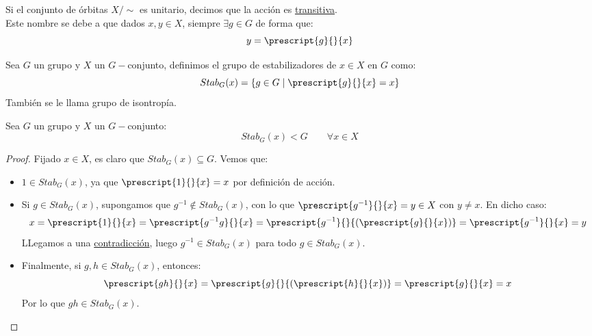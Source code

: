 \begin{definicion}
    Si el conjunto de órbitas $X/\sim$ es unitario, decimos que la acción es \underline{transitiva}.\\

    \noindent
    Este nombre se debe a que dados $x,y\in X$, siempre $\exists g\in G$ de forma que:
    \begin{equation*}
        y = \prescript{g}{}{x}
    \end{equation*}
\end{definicion}

\begin{definicion}[Estabilizador]
    Sea $G$ un grupo y $X$ un $G-$conjunto, definimos el grupo de estabilizadores de $x\in X$ en $G$ como:
    \begin{equation*}
        Stab_G(x) = \{g\in G \mid \prescript{g}{}{x} = x\}
    \end{equation*}
    También se le llama grupo de isontropía.
\end{definicion}

\begin{prop}
    Sea $G$ un grupo y $X$ un $G-$conjunto:
    \begin{equation*}
        Stab_G(x) < G \qquad \forall x\in X
    \end{equation*}
    \begin{proof}
        Fijado $x\in X$, es claro que $Stab_G(x) \subseteq G$. Vemos que:
        \begin{itemize}
            \item $1\in Stab_G(x)$, ya que $\prescript{1}{}{x} = x$ por definición de acción.
            \item Si $g\in Stab_G(x)$, supongamos que $g^{-1}\notin Stab_G(x)$, con lo que $\prescript{g^{-1}}{}{x} = y \in X$ con $y\neq x$. En dicho caso:
                \begin{equation*}
                    x = \prescript{1}{}{x} = \prescript{g^{-1}g}{}{x} = \prescript{g^{-1}}{}{(\prescript{g}{}{x})} = \prescript{g^{-1}}{}{x} = y
                \end{equation*}
                LLegamos a una \underline{contradicción}, luego $g^{-1}\in Stab_G(x)$ para todo $g\in Stab_G(x)$.
            \item Finalmente, si $g,h\in Stab_G(x)$, entonces:
                \begin{equation*}
                    \prescript{gh}{}{x} = \prescript{g}{}{(\prescript{h}{}{x})} = \prescript{g}{}{x} = x
                \end{equation*}
                Por lo que $gh \in Stab_G(x)$.
        \end{itemize}
    \end{proof}
\end{prop}

